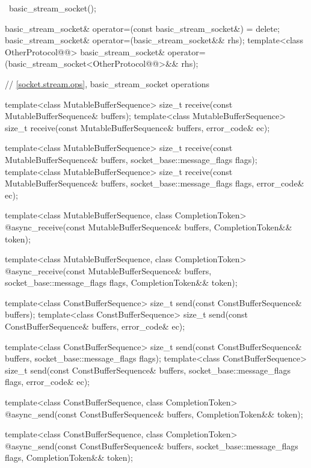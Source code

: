 \begin{codeblock}
{{    ~basic_stream_socket();

    basic_stream_socket& operator=(const basic_stream_socket&) = delete;
    basic_stream_socket& operator=(basic_stream_socket&& rhs);
    template<class OtherProtocol@@>
      basic_stream_socket& operator=(basic_stream_socket<OtherProtocol@@>&& rhs);

    // \ref{socket.stream.ops}, basic_stream_socket operations

    template<class MutableBufferSequence>
      size_t receive(const MutableBufferSequence& buffers);
    template<class MutableBufferSequence>
      size_t receive(const MutableBufferSequence& buffers,
                     error_code& ec);

    template<class MutableBufferSequence>
      size_t receive(const MutableBufferSequence& buffers,
                     socket_base::message_flags flags);
    template<class MutableBufferSequence>
      size_t receive(const MutableBufferSequence& buffers,
                     socket_base::message_flags flags, error_code& ec);

    template<class MutableBufferSequence, class CompletionToken>
      @\DEDUCED@ async_receive(const MutableBufferSequence& buffers,
                            CompletionToken&& token);

    template<class MutableBufferSequence, class CompletionToken>
      @\DEDUCED@ async_receive(const MutableBufferSequence& buffers,
                            socket_base::message_flags flags,
                            CompletionToken&& token);

    template<class ConstBufferSequence>
      size_t send(const ConstBufferSequence& buffers);
    template<class ConstBufferSequence>
      size_t send(const ConstBufferSequence& buffers, error_code& ec);

    template<class ConstBufferSequence>
      size_t send(const ConstBufferSequence& buffers,
                  socket_base::message_flags flags);
    template<class ConstBufferSequence>
      size_t send(const ConstBufferSequence& buffers,
                  socket_base::message_flags flags, error_code& ec);

    template<class ConstBufferSequence, class CompletionToken>
      @\DEDUCED@ async_send(const ConstBufferSequence& buffers,
                         CompletionToken&& token);

    template<class ConstBufferSequence, class CompletionToken>
      @\DEDUCED@ async_send(const ConstBufferSequence& buffers,
                         socket_base::message_flags flags,
                         CompletionToken&& token);

}}
\end{codeblock}

